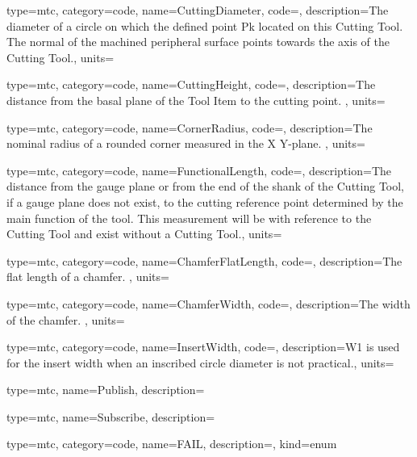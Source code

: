 {
  type=mtc,
  category=code,
  name={CuttingDiameter},
  code=,
  description={The diameter of a circle on which the defined point Pk located on this Cutting Tool. The normal of the machined peripheral surface points towards the axis of the Cutting Tool.},
  units=
}


{
  type=mtc,
  category=code,
  name={CuttingHeight},
  code=,
  description={The distance from the basal plane of the Tool Item to the cutting point. },
  units=
}


{
  type=mtc,
  category=code,
  name={CornerRadius},
  code=,
  description={The nominal radius of a rounded corner measured in the X Y-plane. },
  units=
}


{
  type=mtc,
  category=code,
  name={FunctionalLength},
  code=,
  description={The distance from the gauge plane or from the end of the shank of the Cutting Tool, if a gauge plane does not exist, to the cutting reference point determined by the main function of the tool. This measurement will be with reference to the Cutting Tool and \MUSTNOT exist without a Cutting Tool.},
  units=
}


{
  type=mtc,
  category=code,
  name={ChamferFlatLength},
  code=,
  description={The flat length of a chamfer. },
  units=
}


{
  type=mtc,
  category=code,
  name={ChamferWidth},
  code=,
  description={The width of the chamfer. },
  units=
}


{
  type=mtc,
  category=code,
  name={InsertWidth},
  code=,
  description={W1 is used for the insert width when an inscribed circle diameter is not practical.},
  units=
}


{
  type=mtc,
  name={Publish},
  description={}
}


{
  type=mtc,
  name={Subscribe},
  description={}
}



{
  type=mtc,
  category=code,
  name={FAIL},
  description={},
  kind={enum}
}


